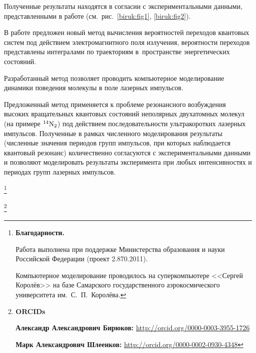 Полученные результаты находятся в согласии с экспериментальными данными, представленными в работе \cite{biruk:Zhdanovich_12} (см.~рис.~\ref{biruk:fig1}, \ref{biruk:fig2}).



\smallskip




В работе предложен новый метод вычисления вероятностей переходов квантовых систем под действием электромагнитного поля излучения, вероятности переходов представлены интегралами по траекториям в~пространстве энергетических состояний.



Разработанный метод позволяет проводить компьютерное моделирование динамики поведения молекулы в поле лазерных импульсов.



Предложенный метод применяется к проблеме резонансного возбуждения высоких вращательных квантовых состояний неполярных двухатомных молекул (на примере $^{14}\rm N_2$) под действием последовательности ультракоротких лазерных импульсов. Полученные в рамках численного моделирования результаты (численные значения периодов групп импульсов, при которых наблюдается квантовый резонанс) количественно согласуются с экспериментальными данными и позволяют моделировать результаты эксперимента при любых интенсивностях и периодах групп лазерных импульсов.





\thanks{\textbf{Благодарности.} 

Работа  выполнена при поддержке Министерства образования и науки Российской Федерации (проект 2.870.2011).



Компьютерное моделирование проводилось на суперкомпьютере <<Сергей Королёв>> на базе Самарского государственного аэрокосмического университета им.~С.~П.~Королёва.}



\thanks{{\bf ORCIDs}



{\bf Александр Александрович Бирюков:} \url{http://orcid.org/0000-0003-3955-1726}



{\bf Марк Александрович Шлеенков:} \url{http://orcid.org/0000-0002-0930-4348}



}





